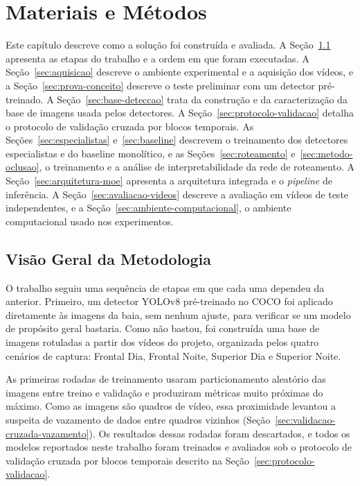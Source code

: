 %
%
%
\chapter{Materiais e Métodos}
\label{cap:materiais-metodos}

Este capítulo descreve como a solução foi construída e avaliada. A Seção~\ref{sec:visao-geral-metodo} apresenta as etapas do trabalho e a ordem em que foram executadas. A Seção~\ref{sec:aquisicao} descreve o ambiente experimental e a aquisição dos vídeos, e a Seção~\ref{sec:prova-conceito} descreve o teste preliminar com um detector pré-treinado. A Seção~\ref{sec:base-deteccao} trata da construção e da caracterização da base de imagens usada pelos detectores. A Seção~\ref{sec:protocolo-validacao} detalha o protocolo de validação cruzada por blocos temporais. As Seções~\ref{sec:especialistas} e~\ref{sec:baseline} descrevem o treinamento dos detectores especialistas e do baseline monolítico, e as Seções~\ref{sec:roteamento} e~\ref{sec:metodo-oclusao}, o treinamento e a análise de interpretabilidade da rede de roteamento. A Seção~\ref{sec:arquitetura-moe} apresenta a arquitetura integrada e o \textit{pipeline} de inferência. A Seção~\ref{sec:avaliacao-videos} descreve a avaliação em vídeos de teste independentes, e a Seção~\ref{sec:ambiente-computacional}, o ambiente computacional usado nos experimentos.

\section{Visão Geral da Metodologia}
\label{sec:visao-geral-metodo}

O trabalho seguiu uma sequência de etapas em que cada uma dependeu da anterior. Primeiro, um detector YOLOv8 pré-treinado no COCO foi aplicado diretamente às imagens da baia, sem nenhum ajuste, para verificar se um modelo de propósito geral bastaria. Como não bastou, foi construída uma base de imagens rotuladas a partir dos vídeos do projeto, organizada pelos quatro cenários de captura: Frontal Dia, Frontal Noite, Superior Dia e Superior Noite.

As primeiras rodadas de treinamento usaram particionamento aleatório das imagens entre treino e validação e produziram métricas muito próximas do máximo. Como as imagens são quadros de vídeo, essa proximidade levantou a suspeita de vazamento de dados entre quadros vizinhos (Seção~\ref{sec:validacao-cruzada-vazamento}). Os resultados dessas rodadas foram descartados, e todos os modelos reportados neste trabalho foram treinados e avaliados sob o protocolo de validação cruzada por blocos temporais descrito na Seção~\ref{sec:protocolo-validacao}.

